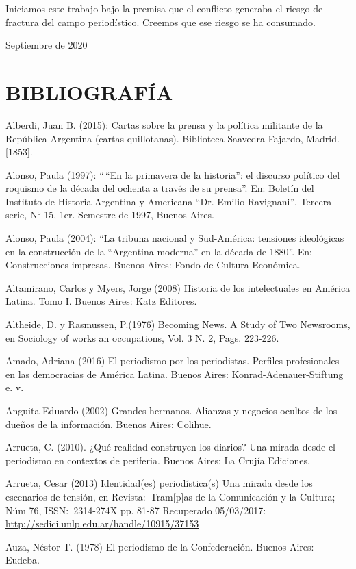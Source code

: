 Iniciamos este trabajo bajo la premisa que el conflicto generaba el riesgo de fractura del campo periodístico. Creemos que ese riesgo se ha consumado.

Septiembre de 2020


\chapter{BIBLIOGRAFÍA}

Alberdi, Juan B. (2015): Cartas sobre la prensa y la política militante de la República Argentina (cartas quillotanas). Biblioteca Saavedra Fajardo, Madrid. {[}1853{]}.

Alonso, Paula (1997): ``\,``En la primavera de la historia'': el discurso político del roquismo de la década del ochenta a través de su prensa''. En: Boletín del Instituto de Historia Argentina y Americana ``Dr. Emilio Ravignani'', Tercera serie, N° 15, 1er. Semestre de 1997, Buenos Aires.

Alonso, Paula (2004): ``La tribuna nacional y Sud-América: tensiones ideológicas en la construcción de la ``Argentina moderna'' en la década de 1880''. En: Construcciones impresas. Buenos Aires: Fondo de Cultura Económica.

Altamirano, Carlos y Myers, Jorge (2008) Historia de los intelectuales en América Latina. Tomo I. Buenos Aires: Katz Editores.

Altheide, D. y Rasmussen, P.(1976) Becoming News. A Study of Two Newsrooms, en Sociology of works an occupations, Vol. 3 N. 2, Pags. 223-226.

Amado, Adriana (2016) El periodismo por los periodistas. Perfiles profesionales en las democracias de América Latina. Buenos Aires: Konrad-Adenauer-Stiftung e. v.

Anguita Eduardo (2002) Grandes hermanos. Alianzas y negocios ocultos de los dueños de la información. Buenos Aires: Colihue.

Arrueta, C. (2010). ¿Qué realidad construyen los diarios? Una mirada desde el periodismo en contextos de periferia. Buenos Aires: La Crujía Ediciones.

Arrueta, Cesar (2013) Identidad(es) periodística(s) Una mirada desde los escenarios de tensión, en Revista:~Tram{[}p{]}as de la Comunicación y la Cultura; Núm 76, ISSN:~2314-274X pp. 81-87 Recuperado 05/03/2017: \url{http://sedici.unlp.edu.ar/handle/10915/37153}

Auza, Néstor T. (1978) El periodismo de la Confederación. Buenos Aires: Eudeba.

